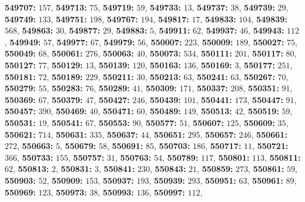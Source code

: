 \textsf{\bfseries 549707:} $157$, \textsf{\bfseries 549713:} $75$, \textsf{\bfseries 549719:} $59$, \textsf{\bfseries 549733:} $13$, \textsf{\bfseries 549737:} $38$, \textsf{\bfseries 549739:} $29$, \textsf{\bfseries 549749:} $133$, \textsf{\bfseries 549751:} $198$, \textsf{\bfseries 549767:} $194$, \textsf{\bfseries 549817:} $17$, \textsf{\bfseries 549833:} $104$, \textsf{\bfseries 549839:} $568$, \textsf{\bfseries 549863:} $30$, \textsf{\bfseries 549877:} $29$, \textsf{\bfseries 549883:} $5$, \textsf{\bfseries 549911:} $62$, \textsf{\bfseries 549937:} $46$, \textsf{\bfseries 549943:} $112$, \textsf{\bfseries 549949:} $57$, \textsf{\bfseries 549977:} $67$, \textsf{\bfseries 549979:} $56$, \textsf{\bfseries 550007:} $223$, \textsf{\bfseries 550009:} $189$, \textsf{\bfseries 550027:} $75$, \textsf{\bfseries 550049:} $68$, \textsf{\bfseries 550061:} $276$, \textsf{\bfseries 550063:} $40$, \textsf{\bfseries 550073:} $534$, \textsf{\bfseries 550111:} $201$, \textsf{\bfseries 550117:} $80$, \textsf{\bfseries 550127:} $77$, \textsf{\bfseries 550129:} $13$, \textsf{\bfseries 550139:} $120$, \textsf{\bfseries 550163:} $136$, \textsf{\bfseries 550169:} $3$, \textsf{\bfseries 550177:} $251$, \textsf{\bfseries 550181:} $72$, \textsf{\bfseries 550189:} $229$, \textsf{\bfseries 550211:} $30$, \textsf{\bfseries 550213:} $63$, \textsf{\bfseries 550241:} $63$, \textsf{\bfseries 550267:} $70$, \textsf{\bfseries 550279:} $55$, \textsf{\bfseries 550283:} $76$, \textsf{\bfseries 550289:} $41$, \textsf{\bfseries 550309:} $171$, \textsf{\bfseries 550337:} $208$, \textsf{\bfseries 550351:} $91$, \textsf{\bfseries 550369:} $67$, \textsf{\bfseries 550379:} $47$, \textsf{\bfseries 550427:} $246$, \textsf{\bfseries 550439:} $101$, \textsf{\bfseries 550441:} $173$, \textsf{\bfseries 550447:} $91$, \textsf{\bfseries 550457:} $390$, \textsf{\bfseries 550469:} $40$, \textsf{\bfseries 550471:} $60$, \textsf{\bfseries 550489:} $149$, \textsf{\bfseries 550513:} $42$, \textsf{\bfseries 550519:} $59$, \textsf{\bfseries 550531:} $19$, \textsf{\bfseries 550541:} $67$, \textsf{\bfseries 550553:} $90$, \textsf{\bfseries 550577:} $51$, \textsf{\bfseries 550607:} $125$, \textsf{\bfseries 550609:} $35$, \textsf{\bfseries 550621:} $714$, \textsf{\bfseries 550631:} $335$, \textsf{\bfseries 550637:} $44$, \textsf{\bfseries 550651:} $295$, \textsf{\bfseries 550657:} $246$, \textsf{\bfseries 550661:} $272$, \textsf{\bfseries 550663:} $5$, \textsf{\bfseries 550679:} $58$, \textsf{\bfseries 550691:} $85$, \textsf{\bfseries 550703:} $186$, \textsf{\bfseries 550717:} $11$, \textsf{\bfseries 550721:} $366$, \textsf{\bfseries 550733:} $155$, \textsf{\bfseries 550757:} $31$, \textsf{\bfseries 550763:} $54$, \textsf{\bfseries 550789:} $117$, \textsf{\bfseries 550801:} $113$, \textsf{\bfseries 550811:} $62$, \textsf{\bfseries 550813:} $2$, \textsf{\bfseries 550831:} $3$, \textsf{\bfseries 550841:} $230$, \textsf{\bfseries 550843:} $21$, \textsf{\bfseries 550859:} $273$, \textsf{\bfseries 550861:} $59$, \textsf{\bfseries 550903:} $52$, \textsf{\bfseries 550909:} $153$, \textsf{\bfseries 550937:} $193$, \textsf{\bfseries 550939:} $293$, \textsf{\bfseries 550951:} $63$, \textsf{\bfseries 550961:} $89$, \textsf{\bfseries 550969:} $123$, \textsf{\bfseries 550973:} $38$, \textsf{\bfseries 550993:} $136$, \textsf{\bfseries 550997:} $112$, 
